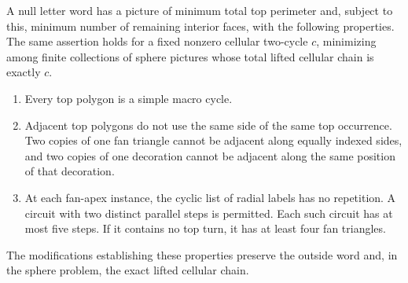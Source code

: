 \begin{lemma}\label{diagram:normal-form}
A null letter word has a picture of minimum total top perimeter and,
subject to this, minimum number of remaining interior faces, with the
following properties.  The same assertion holds for a fixed nonzero
cellular two-cycle $c$, minimizing among finite collections of sphere
pictures whose total lifted cellular chain is exactly $c$.
\begin{enumerate}
\item Every top polygon is a simple macro cycle.
\item Adjacent top polygons do not use the same side of the same
top occurrence.  Two copies of one fan triangle cannot be adjacent
along equally indexed sides, and two copies of one decoration cannot
be adjacent along the same position of that decoration.
\item At each fan-apex instance, the cyclic list of radial labels has
no repetition.  A circuit with two distinct parallel steps is
permitted.  Each such circuit has at most five steps.  If it contains
no top turn, it has at least four fan triangles.
\end{enumerate}
The modifications establishing these properties preserve the outside
word and, in the sphere problem, the exact lifted cellular chain.
\end{lemma}

